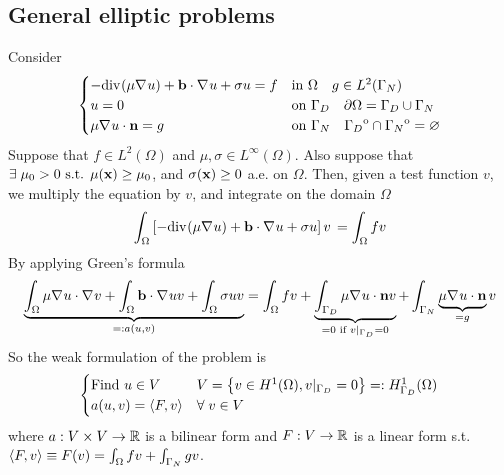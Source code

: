 \subsection*{General elliptic problems}
Consider 
\begin{equation}
    \begin{cases}
        -\text{div}\mspace{1mu}(\mu \nabla\mspace{1mu} u)+ \textbf{b}\cdot \nabla\mspace{1mu} u + \sigma u = f& \text{in } \Omega \quad g \in L^2(\Gamma_N) \\
        u = 0 & \text{on }\Gamma_D \quad \partial\Omega = \Gamma_D \cup \Gamma_N \\

        \mu \nabla\mspace{1mu} u \cdot \textbf{n} = g & \text{on } \Gamma_N \quad {\kern0pt\Gamma_D}^{\mathrm{o}} \cap {\kern0pt\Gamma_N}^{\mathrm{o}} = \varnothing
    \end{cases}
\end{equation}
Suppose that \(f \in L^2(\Omega)\) and \(\mu, \sigma \in L^\infty(\Omega)\). Also suppose that \(\exists \; \mu_0 > 0 \text{ s.t. } \mu(\textbf{x}) \geq \mu_0\), and \(\sigma(\textbf{x}) \geq 0\) a.e. on \(\Omega\).  
Then, given a test function \(v\), we multiply the equation by \(v\), and integrate on the domain \(\Omega\)
\begin{equation*}
    \int_\Omega \left[-\text{div}\mspace{1mu}(\mu \nabla\mspace{1mu} u)+ \textbf{b}\cdot \nabla\mspace{1mu} u + \sigma u\right] v \,  = \int_\Omega f v 
\end{equation*}
By applying Green's formula 
\begin{equation*}
    \underbrace{\int_\Omega \mu\nabla\mspace{1mu} u \cdot \nabla\mspace{1mu} v  + \int_\Omega \textbf{b} \cdot \nabla\mspace{1mu} u v + \int_\Omega \sigma u v}_{=: a(u,v)} = \int_\Omega f v +\underbrace{\int_{\Gamma_D} \mu \nabla\mspace{1mu} u \cdot \textbf{n} v}_{= 0 \text{ if } v\vert_{\Gamma_D} = 0} + \int_{\Gamma_N} \underbrace{\mu \nabla\mspace{1mu} u \cdot \textbf{n}}_{= g} v 
\end{equation*}
So the weak formulation of the problem is 
\begin{equation}
    \begin{cases}
        \text{Find } u \in V & V = \left\{v \in H^1(\Omega), v\vert_{\Gamma_D} = 0\right\} =: H^1_{\Gamma_D}(\Omega)\\
        a(u,v) = \langle F,v \rangle & \forall \; v \in V \label{Weak Formulation of Boundary Value Problems}
    \end{cases}
\end{equation}
where \(a: V \times V \to \mathbb{R}\) is a bilinear form and \(F:V \to \mathbb{R}\) is a linear form s.t. \(\langle F,v \rangle \equiv F(v) = \int_\Omega fv + \int_{\Gamma_N} gv\).
